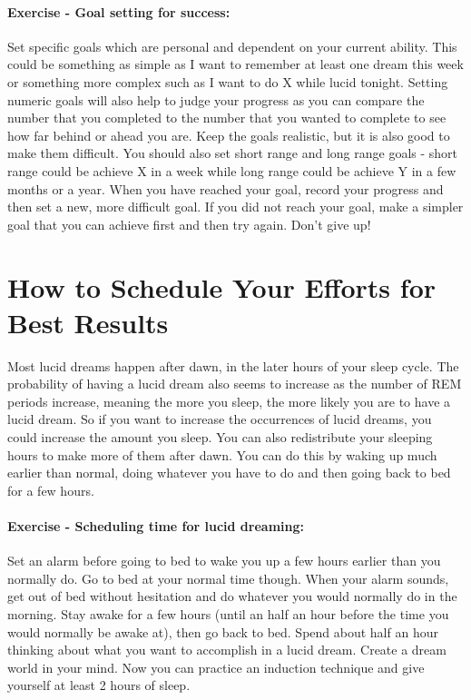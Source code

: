 \documentclass{report}
\begin{document}
\paragraph{Exercise - Goal setting for success:} Set specific goals which are personal and dependent on your current ability. This could be something as simple as I want to remember at least one dream this week or something more complex such as I want to do X while lucid tonight. Setting numeric goals will also help to judge your progress as you can compare the number that you completed to the number that you wanted to complete to see how far behind or ahead you are. Keep the goals realistic, but it is also good to make them difficult. You should also set short range and long range goals - short range could be achieve X in a week while long range could be achieve Y in a few months or a year. When you have reached your goal, record your progress and then set a new, more difficult goal. If you did not reach your goal, make a simpler goal that you can achieve first and then try again. Don't give up!

\section{How to Schedule Your Efforts for Best Results}
Most lucid dreams happen after dawn, in the later hours of your sleep cycle. The probability of having a lucid dream also seems to increase as the number of REM periods increase, meaning the more you sleep, the more likely you are to have a lucid dream. So if you want to increase the occurrences of lucid dreams, you could increase the amount you sleep. You can also redistribute your sleeping hours to make more of them after dawn. You can do this by waking up much earlier than normal, doing whatever you have to do and then going back to bed for a few hours.

\paragraph{Exercise - Scheduling time for lucid dreaming:} Set an alarm before going to bed to wake you up a few hours earlier than you normally do. Go to bed at your normal time though. When your alarm sounds, get out of bed without hesitation and do whatever you would normally do in the morning. Stay awake for a few hours (until an half an hour before the time you would normally be awake at), then go back to bed. Spend about half an hour thinking about what you want to accomplish in a lucid dream. Create a dream world in your mind. Now you can practice an induction technique and give yourself at least 2 hours of sleep.
\end{document}
